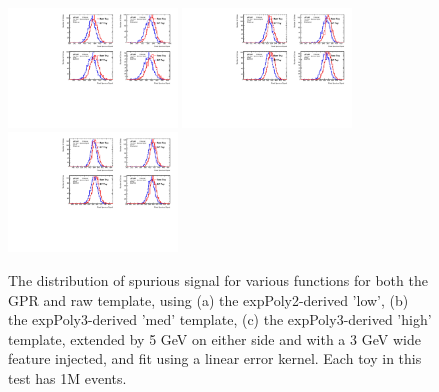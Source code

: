 \begin{figure} 
\begin{center}
  \includegraphics[width=0.4\textwidth]{figures/background/gpr/validation/linear/ToyTest_FitSigVals_lowpT_1M_Sig_1s}   
  \includegraphics[width=0.4\textwidth]{figures/background/gpr/validation/linear/ToyTest_FitSigVals_medpT_1M_Sig_1s}   
  \includegraphics[width=0.4\textwidth]{figures/background/gpr/validation/linear/ToyTest_FitSigVals_highpT_1M_Sig_1s}   
\caption{The distribution of spurious signal for various functions for both the GPR and raw template, using (a) the expPoly2-derived 'low', (b) the expPoly3-derived 'med' template, (c) the expPoly3-derived 'high' template, extended by 5 GeV on either side and with a 3 GeV wide feature injected, and fit using a linear error kernel. Each toy in this test has 1M events.}
\label{fig:linearkernel_lowpt_1M_Sig_1s}
\end{center}
\end{figure}

